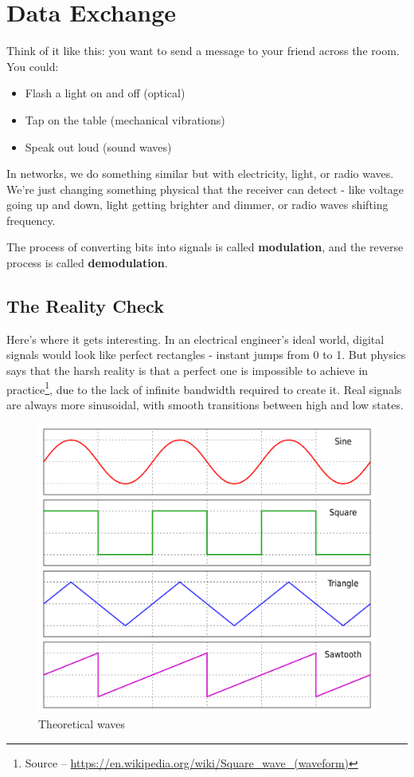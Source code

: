 \section{Data Exchange}
Think of it like this: you want to send a message to your friend across the room. You could:
\begin{itemize}
    \item Flash a light on and off (optical)
    \item Tap on the table (mechanical vibrations)
    \item Speak out loud (sound waves)
\end{itemize}

In networks, we do something similar but with electricity, light, or radio waves. We're just changing something physical that the receiver can detect - like voltage going up and down, light getting brighter and dimmer, or radio waves shifting frequency.

\begin{importantblock}
    The process of converting bits into signals is called \textbf{modulation}, and the reverse process is called \textbf{demodulation}.
\end{importantblock}



\subsection{The Reality Check}

Here's where it gets interesting. In an electrical engineer's ideal world, digital signals would look like perfect rectangles - instant jumps from 0 to 1. But physics says that the harsh reality is that a perfect one is impossible to achieve in practice\footnote{Source -- \href{https://en.wikipedia.org/wiki/Square_wave_(waveform)\#Characteristics_of_imperfect_square_waves}{https://en.wikipedia.org/wiki/Square\_wave\_(waveform)}}, due to the lack of infinite bandwidth required to create it. Real signals are always more sinusoidal, with smooth transitions between high and low states.

\begin{figure}[h]
    \centering
    \includegraphics[width=.7\textwidth]{assets/osi/physical/waves.png}
    \caption{Theoretical waves}\label{fig:theoretical_waves}
\end{figure}


